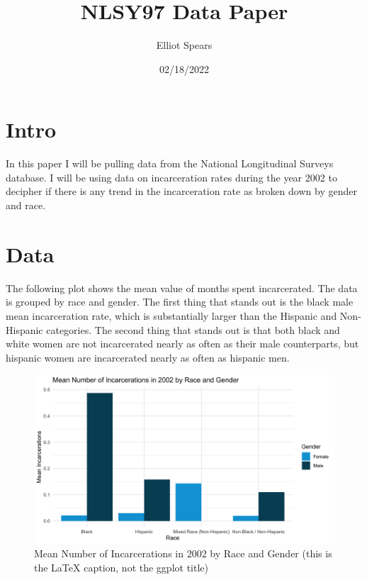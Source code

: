 \documentclass{article}
\author{Elliot Spears}
\title{NLSY97 Data Paper}
\date{02/18/2022}
\begin{document}
\maketitle

\section{Intro}

In this paper I will be pulling data from the National Longitudinal Surveys database. I will be using data on incarceration rates during the year 2002 to decipher if there is any trend in the incarceration rate as broken down by gender and race.

\section{Data}

The following plot shows the mean value of months spent incarcerated. The data is grouped by race and gender. The first thing that stands out is the black male mean incarceration rate, which is substantially larger than the Hispanic and Non-Hispanic categories. The second thing that stands out is that both black and white women are not incarcerated nearly as often as their male counterparts, but hispanic women are incarcerated nearly as often as hispanic men.


\begin{figure}[H]
    \begin{center}
        \includegraphics[width=.85\textwidth]{incarcerations_by_racegender.png}
    \end{center}
    \caption{Mean Number of Incarcerations in 2002 by Race and Gender (this is the LaTeX caption, not the ggplot title)}
    \label{fig:graph}
\end{figure}



\end{document}
